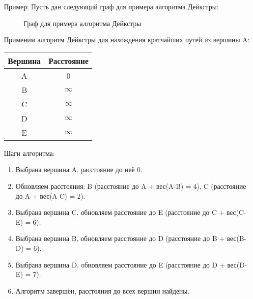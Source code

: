 \documentclass{article}
\begin{document}
Пример:
Пусть дан следующий граф для примера алгоритма Дейкстры:

\begin{figure}[ht]
    \centering
    \caption{Граф для примера алгоритма Дейкстры}
\end{figure}
\pagebreak

Применим алгоритм Дейкстры для нахождения кратчайших путей из вершины A:

\begin{center}
\begin{tabular}{|c|c|}
\hline
Вершина & Расстояние \\
\hline
A & 0 \\
B & $\infty$ \\
C & $\infty$ \\
D & $\infty$ \\
E & $\infty$ \\
\hline
\end{tabular}
\end{center}

Шаги алгоритма:

\begin{enumerate}
    \item Выбрана вершина A, расстояние до неё 0.
    \item Обновляем расстояния: B (расстояние до A + вес(A-B) = 4), C (расстояние до A + вес(A-C) = 2).
    \item Выбрана вершина C, обновляем расстояние до E (расстояние до C + вес(C-E) = 6).
    \item Выбрана вершина B, обновляем расстояние до D (расстояние до B + вес(B-D) = 6).
    \item Выбрана вершина D, обновляем расстояние до E (расстояние до D + вес(D-E) = 7).
    \item Алгоритм завершён, расстояния до всех вершин найдены.
\end{enumerate}
\end{document}
